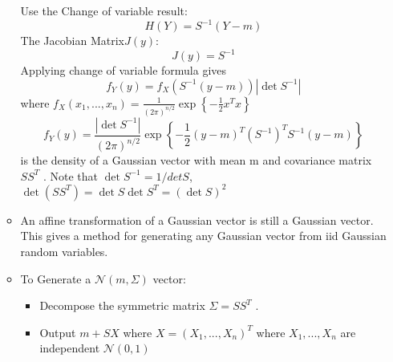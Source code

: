 \documentclass[12pt]{article}
\begin{document}
\begin{itemize}
\begin{itemize}
Use the Change of variable result:
\[
H(Y) = S^{-1}(Y-m)
\]
The Jacobian Matrix$J(y)$:
\[
J(y) = S^{-1}
\]
Applying change of variable formula gives
\[
f_Y(y) = f_X(S^{-1}(y-m))|\det S^{-1}| 
\]
where $f_X(x_1,...,x_n) = \frac{1}{(2\pi )^{n/2}} \exp \left\{ -\frac{1}{2}x^Tx \right\}$
\[
f_Y(y) = \frac{|\det S^{-1}| }{(2\pi)^{n/2}} \exp \left\{ -\frac{1}{2}(y-m)^T(S^{-1})^T S^{-1}(y-m) \right\}
\]
is the density of a Gaussian vector with mean m and covariance matrix $SS^T$ . Note that $\det S^{-1} = 1/detS$, $\det(SS^T)=\det S \det S^T = (\det S)^2$
\item An affine transformation of a Gaussian vector is still a Gaussian vector. This gives a method for generating any Gaussian vector from iid Gaussian random variables.
\item To Generate a $\mathcal{N}(m, \Sigma)$ vector:
\begin{itemize}
\item Decompose the symmetric matrix $\Sigma = SS^T$ .
\item Output $m+SX$ where $X=(X_1,...,X_n)^T$ where $X_1,...,X_n$ are independent $\mathcal{N}(0,1)$

\end{itemize}
\end{itemize}
\end{itemize}
\end{document}

